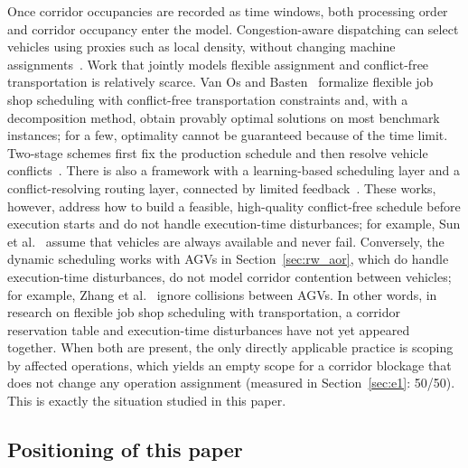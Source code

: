 \documentclass[manuscript,screen,review]{acmart}
\newcommand{\NPairs}{50}
\newcommand{\PassMiss}{\NPairs/\NPairs}      %
\begin{document}
Once corridor occupancies are recorded as time windows, both processing order and corridor occupancy enter the model.
Congestion-aware dispatching can select vehicles using proxies such as local density, without changing machine assignments~\cite{kim2026congestion}.
Work that jointly models flexible assignment and conflict-free transportation is relatively scarce.
Van Os and Basten~\cite{vanos2026exact} formalize flexible job shop scheduling with conflict-free transportation constraints
and, with a decomposition method, obtain provably optimal solutions on most benchmark instances; for a few, optimality cannot be guaranteed because of the time limit.
Two-stage schemes first fix the production schedule and then resolve vehicle conflicts~\cite{sun2023integrated}.
There is also a framework with a learning-based scheduling layer and a conflict-resolving routing layer, connected by limited feedback~\cite{li2026framework}.
These works, however, address how to build a feasible, high-quality conflict-free schedule before execution starts and do not handle execution-time disturbances;
for example, Sun et al.~\cite{sun2023integrated} assume that vehicles are always available and never fail.
Conversely, the dynamic scheduling works with AGVs in Section~\ref{sec:rw_aor}, which do handle execution-time disturbances, do not model corridor contention between vehicles;
for example, Zhang et al.~\cite{zhang2023energy} ignore collisions between AGVs.
In other words, in research on flexible job shop scheduling with transportation, a corridor reservation table and execution-time disturbances have not yet appeared together.
When both are present, the only directly applicable practice is scoping by affected operations,
which yields an empty scope for a corridor blockage that does not change any operation assignment (measured in Section~\ref{sec:e1}: \PassMiss).
This is exactly the situation studied in this paper.

\subsection{Positioning of this paper}
\label{sec:rw_claim}
\end{document}
